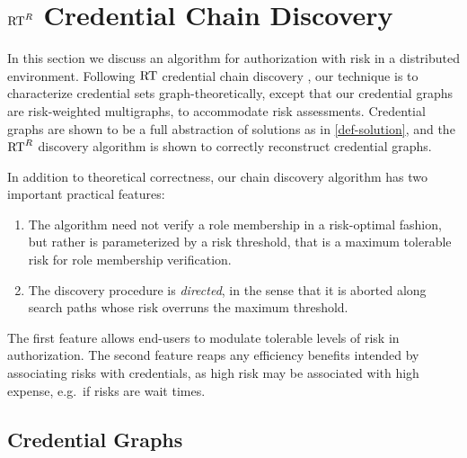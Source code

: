 \section{$\text{RT}^R$ Credential Chain Discovery}
\label{section-chain-discovery}
\label{section-rtr-discovery}

In this section we discuss an algorithm for authorization with risk in
a distributed environment.  Following $\text{RT}$ credential chain discovery
\cite{Li:2003-02}, our technique is to characterize credential sets
graph-theoretically, except that our credential graphs are
risk-weighted multigraphs, to accommodate risk assessments.
Credential graphs are shown to be a full abstraction of solutions as
in \autoref{def-solution}, and the $\text{RT}^R$ discovery algorithm is shown
to correctly reconstruct credential graphs.

In addition to theoretical correctness, our chain discovery algorithm
has two important practical features:
\begin{enumerate}
  \item The algorithm need not verify a role membership in a
  risk-optimal fashion, but rather is parameterized by 
  a risk threshold, that is a maximum tolerable risk for role 
  membership verification.
 \item The discovery procedure is \emph{directed}, in the sense that
it is aborted along search paths whose risk overruns the maximum
threshold.
\end{enumerate}
The first feature allows end-users to modulate tolerable levels of
risk in authorization.  The second feature reaps any efficiency
benefits intended by associating risks with credentials, as high risk
may be associated with high expense, e.g.~if risks are wait times.


\subsection{Credential Graphs}
\label{section-credential-graphs}


